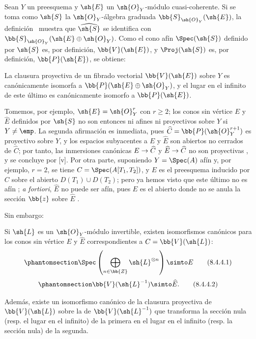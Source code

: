 \documentclass[oneside,10pt]{amsart}
\makeatletter
\renewcommand{\geq}{\geqslant}
\newcommand{\ega@arrow}[2]{\mathchoice{#1}{#2}{#2}{#2}}
\renewcommand{\to}{\ega@arrow{\longrightarrow}{\rightarrow}}
\let\EGAOriginalLabel\label
\renewcommand{\label}[1]{\phantomsection\EGAOriginalLabel{#1}}
\makeatother
\begin{document}
\begin{env}[8.4.1]
\label{II.8.4.1}
Sean $Y$ un preesquema y $\sh{E}$ un $\sh{O}_Y$-módulo cuasi-coherente.
Si se toma como $\sh{S}$ la $\sh{O}_Y$-álgebra graduada $\bb{S}_{\sh{O}_Y}(\sh{E})$, la definición~ muestra que $\widehat{\sh{S}}$ se identifica con $\bb{S}_{\sh{O}_Y}(\sh{E}\oplus\sh{O}_Y)$.
Como el cono afín $\Spec(\sh{S})$ definido por $\sh{S}$ es, por definición, $\bb{V}(\sh{E})$, y $\Proj(\sh{S})$ es, por definición, $\bb{P}(\sh{E})$, se obtiene:
\end{env}
\begin{proposition}[8.4.2]
\label{II.8.4.2}
La clausura proyectiva de un fibrado vectorial $\bb{V}(\sh{E})$ sobre $Y$ es canónicamente isomorfa a $\bb{P}(\sh{E}\oplus\sh{O}_Y)$, y el lugar en el infinito de este último es canónicamente isomorfo a $\bb{P}(\sh{E})$.
\end{proposition}
\begin{remark}[8.4.3]
\label{II.8.4.3}
Tomemos, por ejemplo, $\sh{E}=\sh{O}_Y^r$ con $r\geq2$;
los conos sin vértice $E$ y $\widehat{E}$ definidos por $\sh{S}$ no son entonces ni afines ni proyectivos sobre $Y$ si $Y\neq\emp$.
La segunda afirmación es inmediata, pues $\widehat{C}=\bb{P}(\sh{O}_Y^{r+1})$ es proyectivo sobre $Y$, y los espacios subyacentes a $E$ y $\widehat{E}$ son abiertos no cerrados de $\widehat{C}$; por tanto, las inmersiones canónicas $E\to\widehat{C}$ y $\widehat{E}\to\widehat{C}$ no son proyectivas , y se concluye por [v].
Por otra parte, suponiendo $Y=\Spec(A)$ afín y, por ejemplo, $r=2$, se tiene $C=\Spec(A[T_1,T_2])$, y $E$ es el preesquema inducido por $C$ sobre el abierto $D(T_1)\cup D(T_2)$;
pero ya hemos visto que este último no es afín ;
\emph{a fortiori}, $\widehat{E}$ no puede ser afín, pues $E$ es el abierto donde no se anula la sección $\bb{z}$ sobre $\widehat{E}$ .

Sin embargo:
\end{remark}
\begin{proposition}[8.4.4]
\label{II.8.4.4}
Si $\sh{L}$ es un $\sh{O}_Y$-módulo invertible, existen isomorfismos canónicos para los conos sin vértice $E$ y $\widehat{E}$ correspondientes a $C=\bb{V}(\sh{L})$:
\[
\label{eq:2.8.4.4.1}
  \Spec\left(
    \bigoplus_{n\in\bb{Z}}\sh{L}^{\otimes n}
  \right)
  \simto
  E
\tag{8.4.4.1}
\]
\[
\label{eq:2.8.4.4.2}
  \bb{V}(\sh{L}^{-1})
  \simto
  \widehat{E}.
\tag{8.4.4.2}
\]

Además, existe un isomorfismo canónico de la clausura proyectiva de $\bb{V}(\sh{L})$ sobre la de $\bb{V}(\sh{L}^{-1})$ que transforma la sección nula \textup{(resp.} el lugar en el infinito\textup{)} de la primera en el lugar en el infinito \textup{(resp.} la sección nula\textup{)} de la segunda.
\end{proposition}
\end{document}
